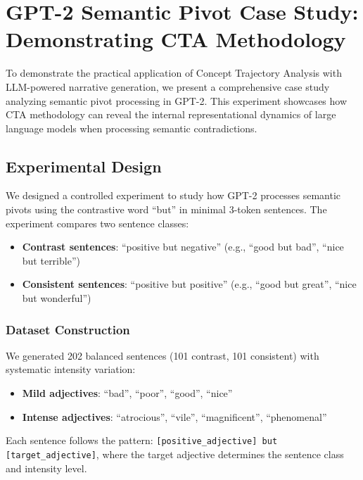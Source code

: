 \section{GPT-2 Semantic Pivot Case Study: Demonstrating CTA Methodology}
\label{sec:gpt2_case_study}

To demonstrate the practical application of Concept Trajectory Analysis with LLM-powered narrative generation, we present a comprehensive case study analyzing semantic pivot processing in GPT-2. This experiment showcases how CTA methodology can reveal the internal representational dynamics of large language models when processing semantic contradictions.

\subsection{Experimental Design}

We designed a controlled experiment to study how GPT-2 processes semantic pivots using the contrastive word ``but'' in minimal 3-token sentences. The experiment compares two sentence classes:

\begin{itemize}
    \item \textbf{Contrast sentences}: ``positive but negative'' (e.g., ``good but bad'', ``nice but terrible'')
    \item \textbf{Consistent sentences}: ``positive but positive'' (e.g., ``good but great'', ``nice but wonderful'')
\end{itemize}

\subsubsection{Dataset Construction}

We generated 202 balanced sentences (101 contrast, 101 consistent) with systematic intensity variation:

\begin{itemize}
    \item \textbf{Mild adjectives}: ``bad'', ``poor'', ``good'', ``nice''
    \item \textbf{Intense adjectives}: ``atrocious'', ``vile'', ``magnificent'', ``phenomenal''
\end{itemize}

Each sentence follows the pattern: \texttt{[positive\_adjective] but [target\_adjective]}, where the target adjective determines the sentence class and intensity level.

